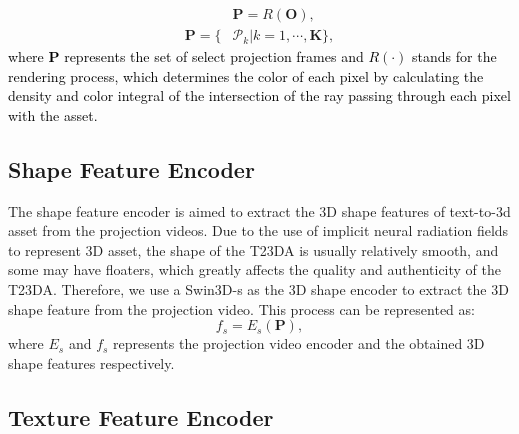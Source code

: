 \begin{equation}
\begin{aligned}
     &\mathbf{P}  = R(\mathbf {O}), \\
    \mathbf{P}  = \{&\mathcal{P}_{k}|k =1,\cdots, \mathbf{K}\},
\end{aligned}
\end{equation}
\textcolor{black}{where $\mathbf{P}$ represents the set of select projection frames and $R(\cdot)$ stands for the rendering process, which determines the color of each pixel by calculating the density and color integral of the intersection of the ray passing through each pixel with the asset.}
\vspace{-13pt}
\subsection{Shape Feature Encoder}
The shape feature encoder is aimed to extract the 3D shape features of text-to-3d asset from the projection videos. Due to the use of implicit neural radiation fields to represent 3D asset, the shape of the T23DA is usually relatively smooth, and some may have floaters, which greatly affects the quality and authenticity of the T23DA. Therefore, we use a Swin3D-s\cite{liu2021swin} as the 3D shape encoder to extract the 3D shape feature from the projection video. This process can be represented as:
\begin{equation}
     f_{s}  =  E_{s}(\mathbf{P}),
\end{equation}
where $E_{s}$ and $f_{s}$ represents the projection video encoder and the obtained 3D shape features respectively.
\vspace{-13pt}
\subsection{Texture Feature Encoder}

